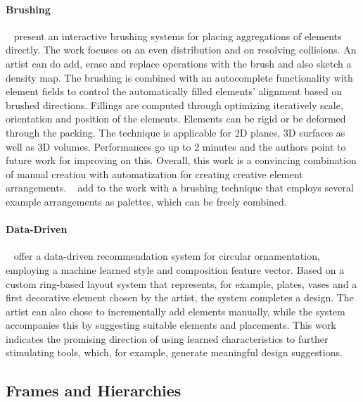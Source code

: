 \paragraph*{Brushing}
\label{para:analysis_element_arrangements_sketching}
 \citeauthor*{hsu_2020_aef}~\cite{hsu_2020_aef} present an interactive brushing systems for placing aggregations of elements directly. The work focuses on an even distribution and on resolving collisions. An artist can do add, erase and replace operations with the brush and also sketch a density map. The brushing is combined with an autocomplete functionality with element fields to control the automatically filled elements' alignment based on brushed directions. Fillings are computed through optimizing iteratively scale, orientation and position of the elements. Elements can be rigid or be deformed through the packing. The technique is applicable for 2D planes, 3D surfaces as well as 3D volumes. Performances go up to 2 minutes and the authors point to future work for improving on this. Overall, this work is a convincing combination of manual creation with automatization for creating creative element arrangements. \citeauthor*{davison_2019_ief}~\cite{davison_2019_ief} add to the work with a brushing technique that employs several example arrangements as palettes, which can be freely combined. 


\paragraph*{Data-Driven}
\label{para:analysis_element_arrangements_datadriven}

\citeauthor*{phan_2016_ple}~\cite{phan_2016_ple} offer a data-driven recommendation system for circular ornamentation, employing a machine learned style and composition feature vector. Based on a custom ring-based layout system that represents, for example, plates, vases and a first decorative element chosen by the artist, the system completes a design. The artist can also chose to incrementally add elements manually, while the system accompanies this by suggesting suitable elements and placements. This work indicates the promising direction of using learned characteristics to further stimulating tools, which, for example, generate meaningful design suggestions.



\subsection{Frames and Hierarchies}
\label{subsec:analysis_frames_and_hierarchies}

